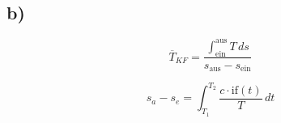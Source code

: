 

\subsection*{b)}

\[
\overline{T}_{KF} = \frac{\int_{\text{ein}}^{\text{aus}} T \, ds}{s_{\text{aus}} - s_{\text{ein}}}
\]

\[
s_a - s_e = \int_{T_1}^{T_2} \frac{c \cdot \text{if}(t)}{T} \, dt
\]